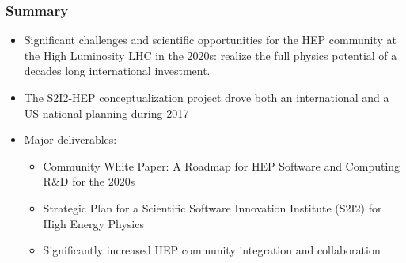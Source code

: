 \begin{frame}
\frametitle{Summary}

\begin{itemize}
\item Significant challenges and scientific opportunities for the HEP community at the High Luminosity LHC in the 2020s: realize the full physics potential of a decades long international investment.
\item The S2I2-HEP conceptualization project drove both an international
and a US national planning during 2017
\item Major deliverables:
   \begin{itemize}
   \item Community White Paper: A Roadmap for HEP Software and Computing R\&D for the 2020s
   \item Strategic Plan for a Scientific Software Innovation Institute (S2I2) for High Energy Physics
   \item Significantly increased HEP community integration and collaboration
   \end{itemize}
\end{itemize}

\end{frame}


